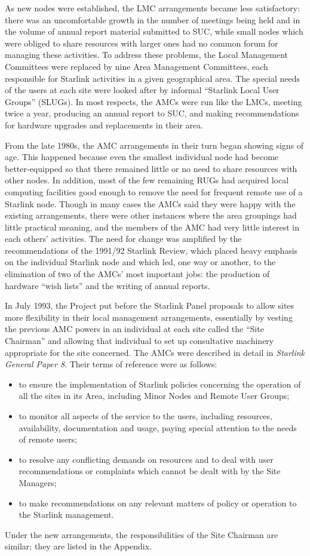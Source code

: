 \documentclass[twoside,11pt]{article}
\begin{document}
As new nodes were established, the LMC arrangements became less
satisfactory:  there was an uncomfortable growth in the number of meetings
being held and in the volume of annual report material submitted to SUC,
while small nodes which were obliged to share resources with larger ones
had no common forum for managing these activities.  To address these
problems, the Local Management Committees were replaced by nine Area
Management Committees, each responsible for Starlink activities in a
given geographical area.  The special needs of the users at each site
were looked after by informal ``Starlink Local User Groups'' (SLUGs).  In
most respects, the AMCs were run like the LMCs, meeting twice a year,
producing an annual report to SUC, and making recommendations for
hardware upgrades and replacements in their area.

From the late 1980s, the AMC arrangements in their turn began showing signs
of age.  This happened because even the smallest individual node had
become better-equipped so that there remained little or no need to share
resources with other nodes.  In addition, most of the few remaining RUGs
had acquired local computing facilities good enough to remove the need for
frequent remote use of a
Starlink node.  Though in many cases the AMCs said they were
happy with the existing arrangements, there were other instances where the
area groupings had little practical meaning, and the members of the AMC
had very little interest in each others' activities.
The need for change was amplified by
the recommendations of the 1991/92 Starlink Review, which placed heavy emphasis
on the individual Starlink node and which led, one way or another, to the
elimination of two of the AMCs' most important jobs:  the production of
hardware ``wish lists'' and the writing of annual reports.

In July 1993, the Project put before the Starlink Panel proposals
to allow sites more flexibility in their local management arrangements,
essentially by vesting the previous AMC powers in an individual at each
site called the ``Site Chairman'' and allowing that individual to
set up consultative machinery appropriate for the site concerned.
The AMCs were described in detail in {\it Starlink General Paper 8}.
Their terms of reference were as follows:
\begin{itemize}
\item to ensure the implementation of Starlink policies concerning the
      operation of all the sites in its Area, including Minor Nodes and
      Remote User Groups;
\item to monitor all aspects of the service to the users, including
      resources, availability, documentation and usage, paying special
      attention to the needs of remote users;
\item to resolve any conflicting demands on resources and to deal with
      user recommendations or complaints which cannot be dealt with by the
      Site Managers;
\item to make recommendations on any relevant matters of policy or
      operation to the Starlink management.
\end{itemize}
Under the new arrangements, the responsibilities of the
Site Chairman are similar;  they are listed in the Appendix.
\end{document}
